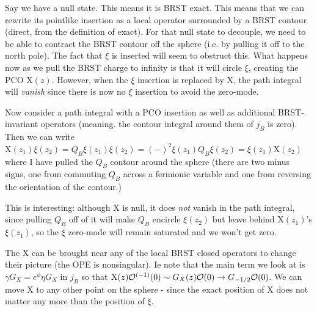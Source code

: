 \documentclass[11pt, class=article, crop=false]{standalone}
\begin{document}
\begin{enumerate}
	Say we have a null state. This means it is BRST exact. This means that we can rewrite its pointlike insertion as a local operator surrounded by a BRST contour (direct, from the definition of exact).
	For that null state to decouple, we need to be able to contract the BRST contour off the sphere (i.e. by pulling it off to the north pole). The fact that $\xi$ is inserted will seem to obstruct this. What happens now as we pull the BRST charge to infinity is that it will circle $\xi$, creating the PCO $\mathrm X(z)$. However, when the $\xi$ insertion is replaced by $\mathrm X$, the path integral will \emph{vanish} since there is now no $\xi$ insertion to avoid the zero-mode.
	
	Now consider a path integral with a PCO insertion as well as additional BRST-invariant operators (meaning. the contour integral around them of $j_B$ is zero). Then we can write $\mathrm X(z_1) \xi(z_2) = Q_B \xi(z_1) \xi(z_2) = (-)^2 \xi(z_1) Q_B \xi(z_2) = \xi(z_1) \mathrm X(z_2) $ where I have pulled the $Q_B$ contour around the sphere (there are two minus signs, one from commuting $Q_B$ across a fermionic variable and one from reversing the orientation of the contour.) 
	
	This is interesting: although $\mathrm X$ is null, it does \emph{not} vanish in the path integral, since pulling $Q_B$ off of it will make $Q_B$ encircle $\xi(z_2)$ but leave behind $\mathrm X(z_1)$'s $\xi(z_1)$, so the $\xi$ zero-mode will remain saturated and we won't get zero. 
	
	The $\mathrm X$ can be brought near any of the local BRST closed operators to change their picture (the OPE is nonsingular). Ie note that the main term we look at is $\gamma G_X = e^{\phi} \eta G_X$ in $j_B$ so that $\mathrm X(z) \mathcal{O}^{(-1)}(0) \sim G_X(z) \mathcal{O}(0) \to G_{-1/2} \mathcal{O}(0)$. We can move $\mathrm X$ to any other point on the sphere - since the exact position of $\mathrm X$ does not matter any more than the position of $\xi$.
	

\end{enumerate}
\end{document}
